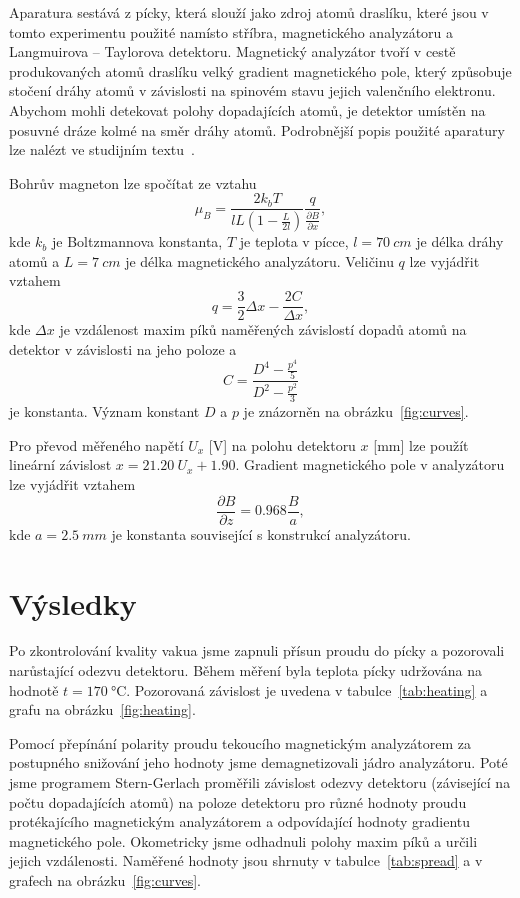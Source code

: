 \documentclass{scirep}
\begin{document}
    Aparatura sestává z pícky, která slouží jako zdroj atomů draslíku, které jsou v tomto experimentu použité namísto stříbra, magnetického analyzátoru a Langmuirova – Taylorova detektoru.
    Magnetický analyzátor tvoří v cestě produkovaných atomů draslíku velký gradient magnetického pole, který způsobuje stočení dráhy atomů v závislosti na spinovém stavu jejich valenčního elektronu.
    Abychom mohli detekovat polohy dopadajících atomů, je detektor umístěn na posuvné dráze kolmé na směr dráhy atomů.
    Podrobnější popis použité aparatury lze nalézt ve studijním textu~\cite{pokyny}.

    Bohrův magneton lze spočítat ze vztahu
    \begin{equation} \label{eq:bohr}
        \mu_B = \frac{2k_b T}{lL\left( 1 - \frac{L}{2l} \right)} \frac{q}{\frac{\partial B}{\partial x}},
    \end{equation}
    kde $k_b$ je Boltzmannova konstanta, $T$ je teplota v pícce, $l = \SI{70}{cm}$ je délka dráhy atomů a $L = \SI{7}{cm}$ je délka magnetického analyzátoru.
    Veličinu $q$ lze vyjádřit vztahem
    \[ q = \frac{3}{2} \Delta x - \frac{2C}{\Delta x}, \]
    kde $\Delta x$ je vzdálenost maxim píků naměřených závislostí dopadů atomů na detektor v závislosti na jeho poloze a
    \[ C = \frac{D^4 - \frac{p^4}{5}}{D^2 - \frac{p^2}{3}} \]
    je konstanta.
    Význam konstant $D$ a $p$ je znázorněn na obrázku~\ref{fig:curves}.

    Pro převod měřeného napětí $U_x$ [V] na polohu detektoru $x$ [mm] lze použít lineární závislost $x = \num{21,20}~U_x + \num{1,90}$.
    Gradient magnetického pole v analyzátoru lze vyjádřit vztahem
    \[ \frac{\partial B}{\partial z} = 0.968 \frac{B}{a}, \]
    kde $a = \SI{2,5}{mm}$ je konstanta související s konstrukcí analyzátoru.


    \section*{Výsledky}

    Po zkontrolování kvality vakua jsme zapnuli přísun proudu do pícky a pozorovali narůstající odezvu detektoru.
    Během měření byla teplota pícky udržována na hodnotě $t = \SI{170}{\celsius}$.
    Pozorovaná závislost je uvedena v tabulce~\ref{tab:heating} a grafu na obrázku~\ref{fig:heating}.


    Pomocí přepínání polarity proudu tekoucího magnetickým analyzátorem za postupného snižování jeho hodnoty jsme demagnetizovali jádro analyzátoru.
    Poté jsme programem Stern-Gerlach proměřili závislost odezvy detektoru (závisející na počtu dopadajících atomů) na poloze detektoru pro různé hodnoty proudu protékajícího magnetickým analyzátorem a odpovídající hodnoty gradientu magnetického pole.
    Okometricky jsme odhadnuli polohy maxim píků a určili jejich vzdálenosti.
    Naměřené hodnoty jsou shrnuty v tabulce~\ref{tab:spread} a v grafech na obrázku~\ref{fig:curves}.
\end{document}
